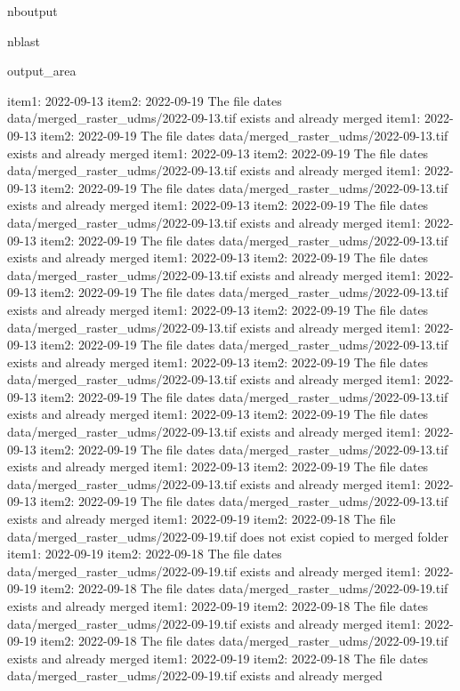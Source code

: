 \documentclass[letterpaper,10pt]{sphinxmanual}
\begin{document}
\begin{sphinxuseclass}{nboutput}
\begin{sphinxuseclass}{nblast}
{\begin{sphinxuseclass}{output_area}
\begin{sphinxuseclass}{}
\begin{sphinxVerbatim}[commandchars=\\\{\}]
item1:  2022-09-13
item2:  2022-09-19
The file dates data/merged\_raster\_udms/2022-09-13.tif exists and already merged
item1:  2022-09-13
item2:  2022-09-19
The file dates data/merged\_raster\_udms/2022-09-13.tif exists and already merged
item1:  2022-09-13
item2:  2022-09-19
The file dates data/merged\_raster\_udms/2022-09-13.tif exists and already merged
item1:  2022-09-13
item2:  2022-09-19
The file dates data/merged\_raster\_udms/2022-09-13.tif exists and already merged
item1:  2022-09-13
item2:  2022-09-19
The file dates data/merged\_raster\_udms/2022-09-13.tif exists and already merged
item1:  2022-09-13
item2:  2022-09-19
The file dates data/merged\_raster\_udms/2022-09-13.tif exists and already merged
item1:  2022-09-13
item2:  2022-09-19
The file dates data/merged\_raster\_udms/2022-09-13.tif exists and already merged
item1:  2022-09-13
item2:  2022-09-19
The file dates data/merged\_raster\_udms/2022-09-13.tif exists and already merged
item1:  2022-09-13
item2:  2022-09-19
The file dates data/merged\_raster\_udms/2022-09-13.tif exists and already merged
item1:  2022-09-13
item2:  2022-09-19
The file dates data/merged\_raster\_udms/2022-09-13.tif exists and already merged
item1:  2022-09-13
item2:  2022-09-19
The file dates data/merged\_raster\_udms/2022-09-13.tif exists and already merged
item1:  2022-09-13
item2:  2022-09-19
The file dates data/merged\_raster\_udms/2022-09-13.tif exists and already merged
item1:  2022-09-13
item2:  2022-09-19
The file dates data/merged\_raster\_udms/2022-09-13.tif exists and already merged
item1:  2022-09-13
item2:  2022-09-19
The file dates data/merged\_raster\_udms/2022-09-13.tif exists and already merged
item1:  2022-09-13
item2:  2022-09-19
The file dates data/merged\_raster\_udms/2022-09-13.tif exists and already merged
item1:  2022-09-13
item2:  2022-09-19
The file dates data/merged\_raster\_udms/2022-09-13.tif exists and already merged
item1:  2022-09-19
item2:  2022-09-18
The file data/merged\_raster\_udms/2022-09-19.tif does not exist copied to merged folder
item1:  2022-09-19
item2:  2022-09-18
The file dates data/merged\_raster\_udms/2022-09-19.tif exists and already merged
item1:  2022-09-19
item2:  2022-09-18
The file dates data/merged\_raster\_udms/2022-09-19.tif exists and already merged
item1:  2022-09-19
item2:  2022-09-18
The file dates data/merged\_raster\_udms/2022-09-19.tif exists and already merged
item1:  2022-09-19
item2:  2022-09-18
The file dates data/merged\_raster\_udms/2022-09-19.tif exists and already merged
item1:  2022-09-19
item2:  2022-09-18
The file dates data/merged\_raster\_udms/2022-09-19.tif exists and already merged

\end{sphinxVerbatim}
\end{sphinxuseclass}
\end{sphinxuseclass}}
\end{sphinxuseclass}
\end{sphinxuseclass}
\end{document}
